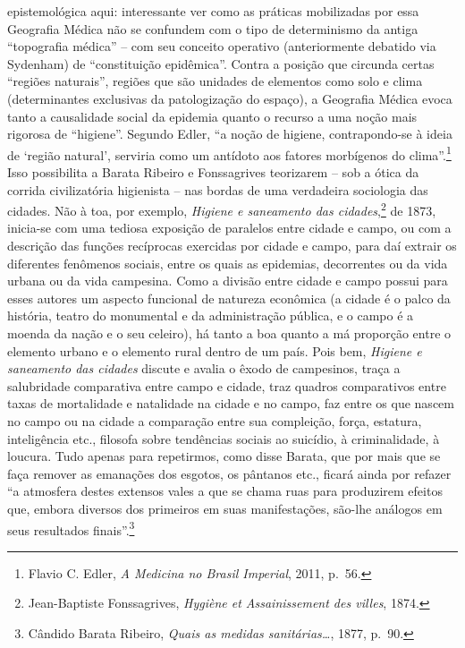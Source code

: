 epistemológica aqui: interessante ver como as práticas mobilizadas por
essa Geografia Médica não se confundem com o tipo de determinismo da
antiga ``topografia médica'' -- com seu conceito operativo
(anteriormente debatido via Sydenham) de ``constituição epidêmica''.
Contra a posição que circunda certas ``regiões naturais'', regiões que
são unidades de elementos como solo e clima (determinantes exclusivas da
patologização do espaço), a Geografia Médica evoca tanto a causalidade
social da epidemia quanto o recurso a uma noção mais rigorosa de
``higiene''. Segundo Edler, ``a noção de higiene, contrapondo-se à ideia
de `região natural', serviria como um antídoto aos fatores morbígenos do
clima''.\footnote{Flavio C. Edler, \emph{A Medicina no Brasil Imperial},
  2011, p.~56.} Isso possibilita a Barata Ribeiro e Fonssagrives
teorizarem -- sob a ótica da corrida civilizatória higienista -- nas
bordas de uma verdadeira sociologia das cidades. Não à toa, por exemplo,
\emph{Higiene e saneamento das cidades},\footnote{Jean-Baptiste
  Fonssagrives, \emph{Hygiène et Assainissement des villes}, 1874.} de
1873, inicia-se com uma tediosa exposição de paralelos entre cidade e
campo, ou com a descrição das funções recíprocas exercidas por cidade e
campo, para daí extrair os diferentes fenômenos sociais, entre os quais
as epidemias, decorrentes ou da vida urbana ou da vida campesina. Como a
divisão entre cidade e campo possui para esses autores um aspecto
funcional de natureza econômica (a cidade é o palco da história, teatro
do monumental e da administração pública, e o campo é a moenda da nação
e o seu celeiro), há tanto a boa quanto a má proporção entre o elemento
urbano e o elemento rural dentro de um país. Pois bem, \emph{Higiene e
saneamento das cidades} discute e avalia o êxodo de campesinos, traça a
salubridade comparativa entre campo e cidade, traz quadros comparativos
entre taxas de mortalidade e natalidade na cidade e no campo, faz entre
os que nascem no campo ou na cidade a comparação entre sua compleição,
força, estatura, inteligência etc., filosofa sobre tendências sociais ao
suicídio, à criminalidade, à loucura. Tudo apenas para repetirmos, como
disse Barata, que por mais que se faça remover as emanações dos esgotos,
os pântanos etc., ficará ainda por refazer ``a atmosfera destes extensos
vales a que se chama ruas para produzirem efeitos que, embora diversos
dos primeiros em suas manifestações, são-lhe análogos em seus resultados
finais''.\footnote{Cândido Barata Ribeiro, \emph{Quais as medidas
  sanitárias\ldots{}}, 1877, p.~90.}

